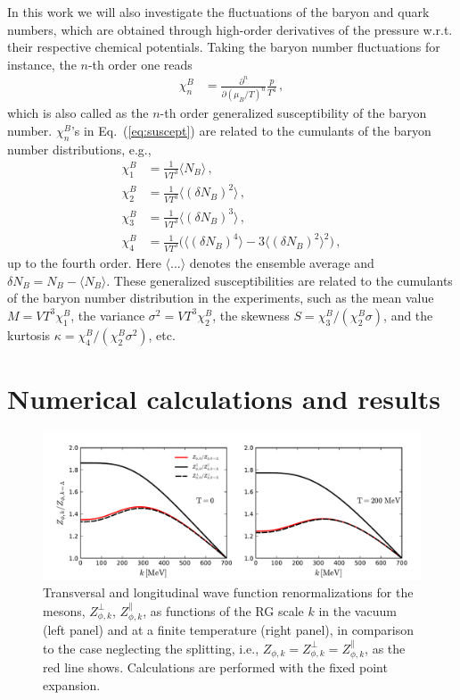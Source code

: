 \documentclass[%
reprint,
superscriptaddress,
showpacs,preprintnumbers,
 amsmath,amssymb,
 aps,
prd,
]{revtex4-1}
\def\Eq#1{Eq.~(\ref{#1})}
\begin{document}
In this work we will also investigate the fluctuations of the baryon and quark numbers, which are obtained through high-order derivatives of the pressure w.r.t. their respective chemical potentials. Taking the baryon number fluctuations for instance, the $n$-th order one reads
\begin{align}
   \chi_n^{B}&=\frac{\partial^n}{\partial (\mu_B/T)^n}\frac{p}{T^4}\,,\label{eq:suscept}
\end{align}
which is also called as the $n$-th order generalized susceptibility of the baryon number. $ \chi_n^{B}$'s in \Eq{eq:suscept} are related to the cumulants of the baryon number distributions, e.g.,
\begin{align}
  \chi_1^B&=\frac{1}{VT^3}\langle N_B \rangle\,,\\[2ex]
  \chi_2^B&=\frac{1}{VT^3}\langle(\delta N_B)^2\rangle\,,\\[2ex]
  \chi_3^B&=\frac{1}{VT^3}\langle(\delta N_B)^3\rangle\,,\\[2ex]
  \chi_4^B&=\frac{1}{VT^3}\Big(\langle(\delta N_B)^4\rangle-3\langle(\delta N_B)^2\rangle^2\Big)\,,
\end{align}
up to the fourth order. Here $\langle ...\rangle$ denotes the ensemble average and $\delta N_B=N_B-\langle N_B\rangle$. These generalized susceptibilities are related to the cumulants of the baryon number distribution in the experiments, such as the mean value $M=VT^3\chi_1^{B}$, the variance $\sigma^2=VT^3\chi_2^{B}$, the skewness $S=\chi_3^{B}/(\chi_2^{B}\sigma)$, and the kurtosis $\kappa=\chi_4^{B}/(\chi_2^{B}\sigma^2)$, etc.



\section{Numerical calculations and results}
\label{sec:num}

%
\begin{figure}[t]
\includegraphics[width=1\textwidth]{zphi}
\caption{Transversal and longitudinal wave function renormalizations for the mesons, $Z_{\phi,k}^{\perp}$, $Z_{\phi,k}^{\parallel}$, as functions of the RG scale $k$ in the vacuum (left panel) and at a finite temperature (right panel), in comparison to the case neglecting the splitting, i.e., $Z_{\phi,k}=Z_{\phi,k}^{\perp}=Z_{\phi,k}^{\parallel}$, as the red line shows. Calculations are performed with the fixed point expansion.}\label{fig:zphi}
\end{figure}
%
\end{document}
